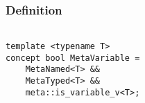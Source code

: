 
\subsubsection{Definition}

\begin{verbatim}

template <typename T>
concept bool MetaVariable =
	MetaNamed<T> &&
	MetaTyped<T> &&
	meta::is_variable_v<T>;

\end{verbatim}
